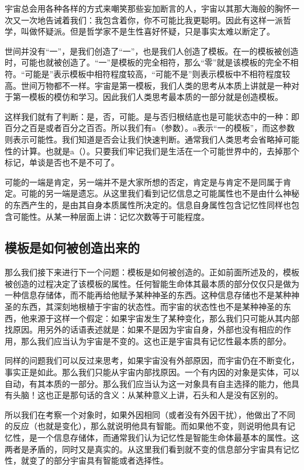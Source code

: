 \documentclass[11pt,oneside]{article}
\begin{document}
宇宙总会用各种各样的方式来嘲笑那些妄加断言的人，宇宙以其那大海般的胸怀一次又一次地告诫着我们：我包含着你，你不可能比我更聪明。因此有这样一派哲学，叫做怀疑派。但是哲学家不是生性喜好怀疑，只是事实太难以断定了。

世间并没有“一”，是我们创造了“一”，也是我们人创造了模板。在一的模板被创造时，可能也就被创造了。“一”是模板的完全相符，那么“零”就是该模板的完全不相符。“可能是”表示模板中相符程度较高，“可能不是”则表示模板中不相符程度较高。世间万物都不一样。宇宙是第一模板，我们人类的思考从本质上讲就是一种对于第一模板的模仿和学习。因此我们人类思考最本质的一部分就是创造模板。

这样我们就有了判断：是，否，可能。是与否归根结底也是可能状态中的一种：即百分之百是或者百分之百否。所以我们有a（参数）。a表示“一的模板”，而这参数则表示可能性。我们知道是否会让我们快速判断。通常我们人类思考会省略掉可能性的计算。也就是a（）。只要我们牢记我们是生活在一个可能世界中的，去掉那个标记，单谈是否也不是不可了。

可能的一端是肯定，另一端并不是大家所想的否定，肯定是与肯定不是同属于肯定。可能的另一端是遗忘。从这里我们看到记忆信息之可能属性也不是由什么神秘的东西产生的，是由其自身本质属性所决定的。信息自身属性包含记忆性同样也包含可能性。从某一种层面上讲：记忆次数等于可能程度。


\subsection{模板是如何被创造出来的}
\label{sec-1-2}
那么我们接下来进行下一个问题：模板是如何被创造的。正如前面所述及的，模板被创造的过程决定了该模板的属性。任何智能生命体其最本质的部分仅仅只是做为一种信息存储体，而不能再给他赋予某种神圣的东西。这种信息存储也不是某种神圣的东西，其深刻地根植于宇宙的状态性。而宇宙的状态性也不是某种神圣的东西，他来源于这样一个假定：如果宇宙发生了某种变化，那么我们只可能从其内部找原因。用另外的话语表述就是：如果不是因为宇宙自身，外部也没有相应的作用，那么我们应当认为宇宙是不变的。这也正是宇宙具有记忆性最本质的部分。

同样的问题我们可以反过来思考，如果宇宙没有外部原因，而宇宙仍在不断变化，事实正是如此。那么我们只能从宇宙内部找原因。一个有内因的对象是实体，可以自动，有其本质的一部分。那么我们应当认为这一对象具有自主选择的能力，他具有头脑！这也正是那句话的含义：从某种意义上讲，石头和人是没有区别的。

所以我们在考察一个对象时，如果外因相同（或者没有外因干扰），他做出了不同的反应（也就是变化），那么就说明他具有智能。而如果他不变，则说明他具有记忆性，是一个信息存储体，而通常我们认为记忆性是智能生命体最基本的属性。这两者是矛盾的，同时又是真实的。从这里我们看到就不变的信息部分宇宙具有记忆性，就变了的部分宇宙具有智能或者选择性。
\end{document}
